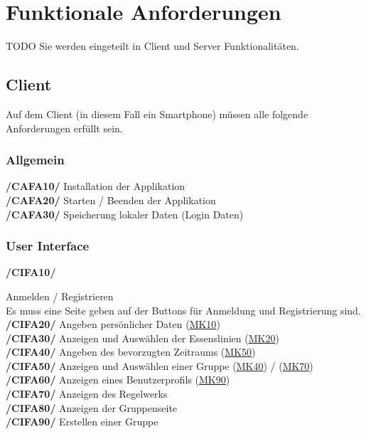 \documentclass[a4paper]{scrreprt}
\begin{document}
\chapter{Funktionale Anforderungen}
TODO Sie werden eingeteilt in Client und Server Funktionalitäten.

\section{Client}
Auf dem Client (in diesem Fall ein Smartphone) müssen alle folgende Anforderungen erfüllt sein. 

\subsection{Allgemein}

\begin{addmargin}[25pt]{0pt} 
\textbf{/CAFA10/} Installation der Applikation \\
\textbf{/CAFA20/} Starten / Beenden der Applikation\\
\textbf{/CAFA30/} Speicherung lokaler Daten (Login Daten)\\
\end{addmargin}

\subsection{User Interface}

\begin{addmargin}[25pt]{0pt} 
\hypertarget{cifa10}{\textbf{/CIFA10/}} Anmelden / Registrieren \\
Es muss eine Seite geben auf der Buttons für Anmeldung und Registrierung sind.
\hypertarget{cifa20}{\textbf{/CIFA20/}} Angeben persönlicher Daten (\hyperlink{mk10}{MK10})\\
\hypertarget{cifa30}{\textbf{/CIFA30/}} Anzeigen und Auswählen der Essenslinien (\hyperlink{mk20}{MK20})\\
\hypertarget{cifa40}{\textbf{/CIFA40/}} Angeben des bevorzugten Zeitraums (\hyperlink{mk50}{MK50})\\
\hypertarget{cifa50}{\textbf{/CIFA50/}} Anzeigen und Auswählen einer Gruppe (\hyperlink{m40}{MK40}) / (\hyperlink{mk70}{MK70})\\
\hypertarget{cifa60}{\textbf{/CIFA60/}} Anzeigen eines Benutzerprofils (\hyperlink{mk90}{MK90})\\
\hypertarget{cifa70}{\textbf{/CIFA70/}} Anzeigen des Regelwerks\\
\hypertarget{cifa80}{\textbf{/CIFA80/}} Anzeigen der Gruppenseite\\
\hypertarget{cifa90}{\textbf{/CIFA90/}} Erstellen einer Gruppe\\
\end{addmargin}
\end{document}
